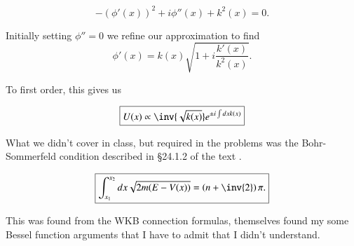 \begin{equation}\label{eqn:qmTwoReview:690}
- (\phi'(x))^2 + i \phi''(x) + k^2(x) = 0.
\end{equation}

Initially setting $\phi'' = 0$ we refine our approximation to find
\begin{equation}\label{eqn:qmTwoReview:710}
\phi'(x) 
= k(x) \sqrt{ 1 + i \frac{k'(x)}{k^2(x)} } .
\end{equation}

To first order, this gives us

\begin{equation}\label{eqn:qmTwoReview:730}
\boxed{
U(x) \propto \inv{\sqrt{k(x)}} e^{\pm i \int dx k(x)} 
}
\end{equation}

What we didn't cover in class, but required in the problems was the Bohr-Sommerfeld condition described in \S 24.1.2 of the text \cite{desai2009quantum}.

\begin{equation}\label{eqn:qmTwoReview:730b}
\boxed{
\int_{x_1}^{x_2} dx \sqrt{ 2m (E - V(x))} = \left( n + \inv{2} \right) \pi.
}
\end{equation}

This was found from the WKB connection formulas, themselves found my some Bessel function arguments that I have to admit that I didn't understand.

%

\EndArticle
